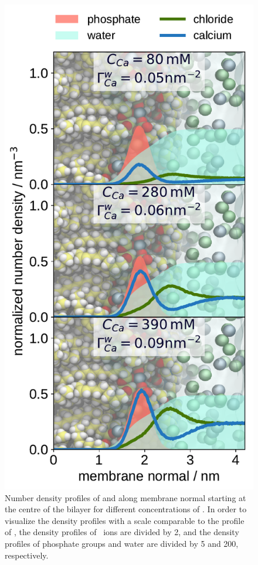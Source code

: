 \begin{figure}[htbp!] 
  \centering 
  \includegraphics[width=\figwidth]{../img/ecc_popc/density_profiles_ca_cl_wat_phos_concentrations-compar.pdf} 
  \caption{\label{fig:cacl-dens} 
    Number density profiles of  and  along membrane normal starting at the centre of the bilayer 
    for different concentrations of . 
    In order to visualize the density profiles with a scale comparable to the profile of ,  
    the density profiles of~ ions are divided by 2, and 
    the density profiles of phosphate groups and water are divided by 5 and 200, respectively.  
    } 
\end{figure} 


